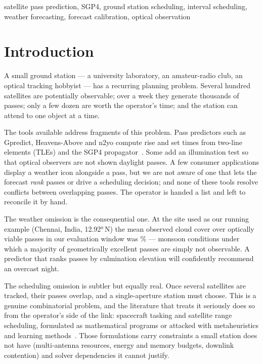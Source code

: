 \documentclass[conference]{IEEEtran}
\begin{document}
\begin{IEEEkeywords}
satellite pass prediction, SGP4, ground station scheduling, interval scheduling,
weather forecasting, forecast calibration, optical observation
\end{IEEEkeywords}

\section{Introduction}

A small ground station --- a university laboratory, an amateur-radio club, an
optical tracking hobbyist --- has a recurring planning problem. Several hundred
satellites are potentially observable; over a week they generate thousands of
passes; only a few dozen are worth the operator's time; and the station can
attend to one object at a time.

The tools available address fragments of this problem. Pass predictors such as
Gpredict, Heavens-Above and n2yo compute rise and set times from two-line
elements (TLEs) and the SGP4 propagator~\cite{vallado2022fundamentals,
acciarini2025sgp4}. Some add an illumination test so that optical observers
are not shown daylight passes. A few consumer applications display a weather
icon alongside a pass, but we are not aware of one that lets the forecast
\emph{rank} passes or drive a scheduling decision; and none of these tools
resolve conflicts between overlapping passes. The operator is handed a list and
left to reconcile it by hand.

The weather omission is the consequential one. At the site used as our running
example (Chennai, India, \ang{12.92}\,N) the mean observed cloud cover over
optically viable passes in our evaluation window was \CloudChennai\% --- monsoon
conditions under which a majority of geometrically excellent passes are simply
not observable. A predictor that ranks passes by culmination elevation will
confidently recommend an overcast night.

The scheduling omission is subtler but equally real. Once several satellites are
tracked, their passes overlap, and a single-aperture station must choose. This is
a genuine combinatorial problem, and the literature that treats it seriously does
so from the operator's side of the link: spacecraft tasking and satellite range
scheduling, formulated as mathematical programs or attacked with
metaheuristics and learning methods~\cite{li2023srsp, song2023cluster,
ou2023drl, wang2024avns, wang2021agile}. Those formulations carry
constraints a small station does not have (multi-antenna resources, energy and
memory budgets, downlink contention) and solver dependencies it cannot justify.
\end{document}
